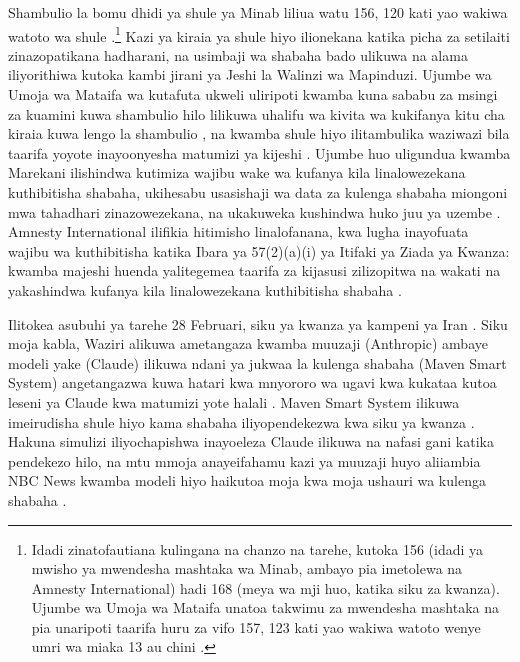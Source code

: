 Shambulio la bomu dhidi ya shule ya Minab liliua watu 156, 120 kati yao wakiwa watoto wa shule \autocite[aya~92]{UNFFMIran2026}.\footnote{Idadi zinatofautiana kulingana na chanzo na tarehe, kutoka 156 (idadi ya mwisho ya mwendesha mashtaka wa Minab, ambayo pia imetolewa na Amnesty International) hadi 168 (meya wa mji huo, katika siku za kwanza). Ujumbe wa Umoja wa Mataifa unatoa takwimu za mwendesha mashtaka na pia unaripoti taarifa huru za vifo 157, 123 kati yao wakiwa watoto wenye umri wa miaka 13 au chini \autocite[aya~92–93]{UNFFMIran2026}.} Kazi ya kiraia ya shule hiyo ilionekana katika picha za setilaiti zinazopatikana hadharani, na usimbaji wa shabaha bado ulikuwa na alama iliyorithiwa kutoka kambi jirani ya Jeshi la Walinzi wa Mapinduzi. Ujumbe wa Umoja wa Mataifa wa kutafuta ukweli uliripoti kwamba kuna sababu za msingi za kuamini kuwa shambulio hilo lilikuwa uhalifu wa kivita wa kukifanya kitu cha kiraia kuwa lengo la shambulio \autocite{ohchr2026minabpress}, na kwamba shule hiyo ilitambulika waziwazi bila taarifa yoyote inayoonyesha matumizi ya kijeshi \autocite[aya~81–86, 124–126]{UNFFMIran2026}. Ujumbe huo uligundua kwamba Marekani ilishindwa kutimiza wajibu wake wa kufanya kila linalowezekana kuthibitisha shabaha, ukihesabu usasishaji wa data za kulenga shabaha miongoni mwa tahadhari zinazowezekana, na ukakuweka kushindwa huko juu ya uzembe \autocite[aya~124–125]{UNFFMIran2026}. Amnesty International ilifikia hitimisho linalofanana, kwa lugha inayofuata wajibu wa kuthibitisha katika Ibara ya 57(2)(a)(i) ya Itifaki ya Ziada ya Kwanza: kwamba majeshi huenda yalitegemea taarifa za kijasusi zilizopitwa na wakati na yakashindwa kufanya kila linalowezekana kuthibitisha shabaha \autocite{Amnesty2026Minab}.

Ilitokea asubuhi ya tarehe 28 Februari, siku ya kwanza ya kampeni ya Iran \autocite{Amnesty2026Minab,crs2026iranwar}. Siku moja kabla, Waziri alikuwa ametangaza kwamba muuzaji (Anthropic) ambaye modeli yake (Claude) ilikuwa ndani ya jukwaa la kulenga shabaha (Maven Smart System) angetangazwa kuwa hatari kwa mnyororo wa ugavi kwa kukataa kutoa leseni ya Claude kwa matumizi yote halali \autocite{npr2026openai}. Maven Smart System ilikuwa imeirudisha shule hiyo kama shabaha iliyopendekezwa kwa siku ya kwanza \autocite{livingstone2026maven,gizmodo2026minab}. Hakuna simulizi iliyochapishwa inayoeleza Claude ilikuwa na nafasi gani katika pendekezo hilo, na mtu mmoja anayeifahamu kazi ya muuzaji huyo aliiambia NBC News kwamba modeli hiyo haikutoa moja kwa moja ushauri wa kulenga shabaha \autocite{nbc2026targeting}.

